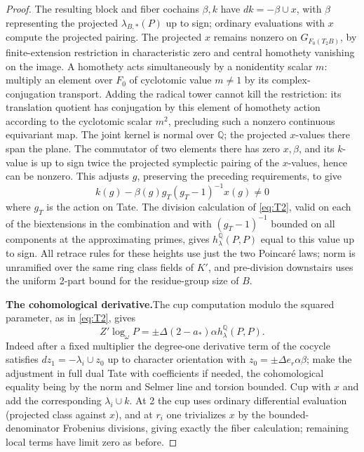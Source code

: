 \begin{proof}
The resulting block and fiber cochains \(\beta,k\) have \(dk=-\beta\cup x\), with \(\beta\)
representing the projected \(\lambda_{B,*}(P)\) up to sign; ordinary evaluations with \(x\)
compute the projected pairing. The projected \(x\) remains nonzero on \(G_{F_0(T_2B)}\), by
finite-extension restriction in characteristic zero and central homothety vanishing on the
image. A homothety acts simultaneously by a nonidentity scalar \(m\): multiply an element over
\(F_0\) of cyclotomic value \(m\ne1\) by its complex-conjugation transport. Adding the radical
tower cannot kill the restriction: its translation quotient has conjugation by this element of
homothety action according to the cyclotomic scalar \(m^2\), precluding such a nonzero
continuous equivariant map. The joint kernel is normal over \(\mathbb Q\); the projected
\(x\)-values there span the plane. The commutator of two elements there has zero \(x,\beta\),
and its \(k\)-value is up to sign twice the projected symplectic pairing of the \(x\)-values,
hence can be nonzero. This adjusts \(g\), preserving the preceding requirements, to give
\[
                k(g)-\beta(g) g_T (g_T-1)^{-1}x(g)\ne0
\]
where \(g_T\) is the action on Tate. The division calculation of \eqref{eq:T2}, valid on each
of the biextensions in the combination and with \((g_T-1)^{-1}\) bounded on all components at
the approximating primes, gives \(h_{\lambda}^{\mathbb Q}(P,P)\) equal to this value up to
sign. All retrace rules for these heights use just the two Poincaré laws; norm is unramified
over the same ring class fields of \(K'\), and pre-division downstairs uses the uniform 2-part
bound for the residue-group size of \(B\).

\par\smallskip\noindent\textbf{The cohomological derivative.}\enspace The cup computation modulo the squared parameter, as
in \eqref{eq:T2}, gives
\begin{equation}\label{cm:eq:cup-derivative}
 Z'\log_\omega P
   =\pm\Delta(2-a_*)\alpha h_{\lambda}^{\mathbb Q}(P,P).
\end{equation}
Indeed after a fixed multiplier the degree-one derivative term of the cocycle satisfies \(d
z_1=-\lambda_i\cup z_0\) up to character orientation with \(z_0=\pm\Delta e_r\alpha\beta\);
make the adjustment in full dual Tate with coefficients if needed, the cohomological equality
being by the norm and Selmer line and torsion bounded. Cup with \(x\) and add the
corresponding \(\lambda_i\cup k\). At 2 the cup uses ordinary differential evaluation
(projected class against \(x\)), and at \(r_i\) one trivializes \(x\) by the
bounded-denominator Frobenius divisions, giving exactly the fiber calculation; remaining local
terms have limit zero as before.


\end{proof}
